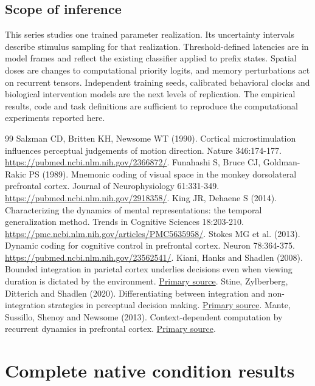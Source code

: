 \documentclass[11pt]{article}
\begin{document}
\subsection{Scope of inference}
This series studies one trained parameter realization. Its uncertainty intervals describe stimulus sampling for that realization. Threshold-defined latencies are in model frames and reflect the existing classifier applied to prefix states. Spatial doses are changes to computational priority logits, and memory perturbations act on recurrent tensors. Independent training seeds, calibrated behavioral clocks and biological intervention models are the next levels of replication. The empirical results, code and task definitions are sufficient to reproduce the computational experiments reported here.

\begin{thebibliography}{99}
 Salzman CD, Britten KH, Newsome WT (1990). Cortical microstimulation influences perceptual judgements of motion direction. Nature 346:174-177. \url{https://pubmed.ncbi.nlm.nih.gov/2366872/}.
 Funahashi S, Bruce CJ, Goldman-Rakic PS (1989). Mnemonic coding of visual space in the monkey dorsolateral prefrontal cortex. Journal of Neurophysiology 61:331-349. \url{https://pubmed.ncbi.nlm.nih.gov/2918358/}.
 King JR, Dehaene S (2014). Characterizing the dynamics of mental representations: the temporal generalization method. Trends in Cognitive Sciences 18:203-210. \url{https://pmc.ncbi.nlm.nih.gov/articles/PMC5635958/}.
 Stokes MG et al. (2013). Dynamic coding for cognitive control in prefrontal cortex. Neuron 78:364-375. \url{https://pubmed.ncbi.nlm.nih.gov/23562541/}.
 Kiani, Hanks and Shadlen (2008). Bounded integration in parietal cortex underlies decisions even when viewing duration is dictated by the environment. \href{https://pmc.ncbi.nlm.nih.gov/articles/PMC6670720/}{Primary source}.
 Stine, Zylberberg, Ditterich and Shadlen (2020). Differentiating between integration and non-integration strategies in perceptual decision making. \href{https://pubmed.ncbi.nlm.nih.gov/32338595/}{Primary source}.
 Mante, Sussillo, Shenoy and Newsome (2013). Context-dependent computation by recurrent dynamics in prefrontal cortex. \href{https://pubmed.ncbi.nlm.nih.gov/24201281/}{Primary source}.
\end{thebibliography}\clearpage\appendix\section{Complete native condition results}
\end{document}
